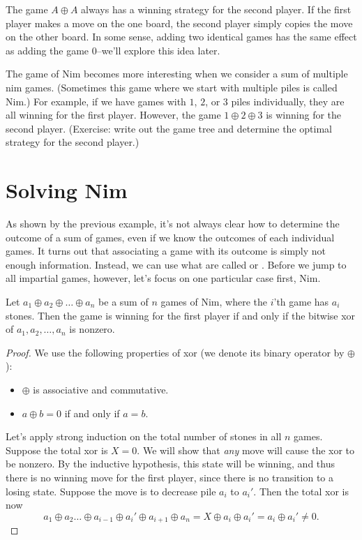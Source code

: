 \documentclass[11pt]{scrartcl}
\begin{document}
\begin{definition}
  \begin{lemma}
  The game $A \oplus A$ always has a winning strategy for the second player.
  If the first player makes a move on the one board, the second player simply copies the move on the other board.
  In some sense, adding two identical games has the same effect as adding the game $0$--we'll explore this idea later.
  \end{lemma}

  \begin{example}
  The game of Nim becomes more interesting when we consider a sum of multiple nim games.
    (Sometimes this game where we start with multiple piles is called Nim.)
    For example, if we have games with $1$, $2$, or $3$ piles individually, they are all winning for the first player.
    However, the game $1 \oplus 2 \oplus 3$ is winning for the second player.
    (Exercise: write out the game tree and determine the optimal strategy for the second player.)
  \end{example}

  \section{Solving Nim}

  As shown by the previous example, it's not always clear how to determine the outcome of a sum of games, even if we know the outcomes of each individual games.
  It turns out that associating a game with its outcome is simply not enough information.
  Instead, we can use what are called  or .
  Before we jump to all impartial games, however, let's focus on one particular case first, Nim.

  \begin{theorem}
    Let $a_1 \oplus a_2 \oplus \dots \oplus a_n$ be a sum of $n$ games of Nim, where the $i$'th game has $a_i$ stones.
    Then the game is winning for the first player if and only if the bitwise xor of $a_1, a_2, \dots, a_n$ is nonzero.
  \end{theorem}
  \begin{proof}
    We use the following properties of xor (we denote its binary operator by $\oplus$):
    \begin{itemize}
        \item $\oplus$ is associative and commutative.
        \item $a \oplus b = 0$ if and only if $a = b$.
    \end{itemize}
  Let's apply strong induction on the total number of stones in all $n$ games.
  Suppose the total xor is $X = 0$.
    We will show that \textit{any} move will cause the xor to be nonzero. By the inductive hypothesis, this state will be winning, and thus there is no winning move for the first player, since there is no transition to a losing state.
    Suppose the move is to decrease pile $a_i$ to $a_i'$.
    Then the total xor is now
    \[
      a_1 \oplus a_2 \dots \oplus a_{i-1} \oplus a_i' \oplus a_{i+1} \oplus a_n = X \oplus a_i \oplus a_i' = a_i \oplus a_i' \neq 0.
    \]


\end{proof}
\end{definition}
\end{document}
